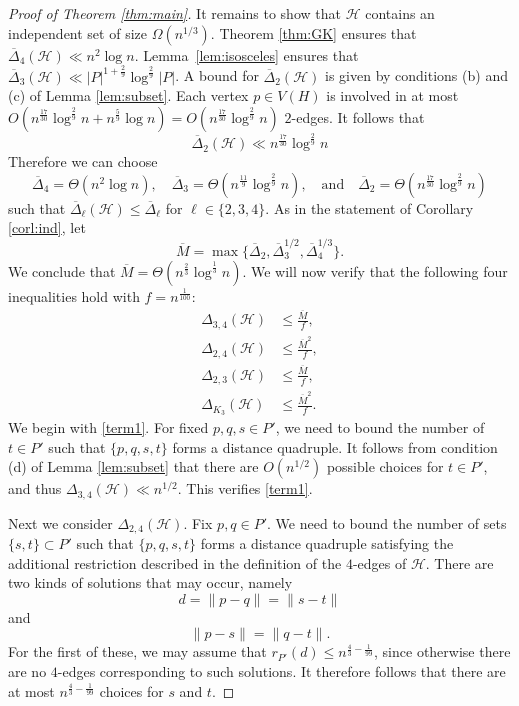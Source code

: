 \documentclass[11pt,oneside]{amsart}
\newcommand{\cH}{\mathcal{H}}
\numberwithin{exercise}{subsection}
\begin{document}
\begin{proof}[Proof of Theorem \ref{thm:main}]
It remains to show that $\mathcal{H}$ contains an independent set of size $\Omega(n^{1/3})$. Theorem \ref{thm:GK} ensures that $\overline{\Delta}_4(\mathcal{H}) \ll n^2 \log n$. Lemma~\ref{lem:isosceles} ensures that $\overline{\Delta}_3(\mathcal{H})\ll |P|^{1+\frac{2}{9}}\log^{\frac{2}{9}}|P|$. A bound for $\overline{\Delta}_2(\mathcal{H})$ is given by conditions (b) and (c) of Lemma \ref{lem:subset}. Each vertex $p \in V(H)$ is involved in at most  $O(n^{\frac{17}{30}} \log^{\frac29}n + n^{\frac59} \log n)=O(n^{\frac{17}{30}} \log^{\frac29}n)$ $2$-edges.  It follows that
\[
\overline{\Delta}_2(\mathcal{H}) \ll n^\frac{17}{30}\log ^{\frac29}n
\]
Therefore we can choose 
\begin{equation*}
\overline{\Delta}_4=\Theta(n^2 \log n), \quad \overline{\Delta}_3=\Theta(n^{\frac{11}{9}} \log^{\frac{2}{9}} n), \quad \text{and} \quad \overline{\Delta}_2=\Theta(n^\frac{17}{30}\log ^{\frac29}n)
\end{equation*}
such that $\overline{\Delta}_\ell(\mathcal{H})\leq \overline{\Delta}_\ell$ for $\ell\in \{2,3,4\}$. As in the statement of Corollary \ref{corl:ind}, let
\[
\overline{M}=\max \{
\overline{\Delta}_2, \overline{\Delta}_3^{1/2}, \overline{\Delta}_4^{1/3} \}.
\]
  We conclude that $\overline M=\Theta( n^{\frac{2}{3}} \log^{\frac{1}{3}} n)$. We will now verify that the following four inequalities hold with $f= n^{\frac{1}{100}}$:
\begin{align}
 \Delta_{3,4}(\cH) &\leq \frac{\overline M}{f} \label{term1},
 \\ \Delta_{2,4}(\cH) &\leq \frac{\overline M^2}{f} \label{term2},
  \\ \Delta_{2,3}(\cH) &\leq \frac{\overline M}{f} \label{term3},
   \\ \Delta_{K_3}(\cH) &\leq \frac{\overline M^2}{f} \label{term4}.
\end{align}
We begin with \eqref{term1}. For fixed $p,q,s \in P'$, we need to bound the number of $t \in P'$ such that $\{p,q,s,t \}$ forms a distance quadruple. It follows from condition (d) of Lemma \ref{lem:subset} that there are $O(n^{1/2})$ possible choices for $t \in P'$, and thus $\Delta_{3,4}(\cH) \ll n^{1/2}$. This verifies \eqref{term1}.

Next we consider $\Delta_{2,4}(\cH)$. Fix $p,q \in P'$. We need to bound the number of sets $\{s,t \} \subset P'$ such that $\{p,q,s,t\}$ forms a distance quadruple satisfying the additional restriction described in the definition of the $4$-edges of $\cH$. There are two kinds of solutions that may occur, namely 
\[
d=\|p-q\|=\|s-t\|
\]
and
\begin{equation} \label{type2}
\|p-s\|=\|q-t\|.
\end{equation}
For the first of these, we may assume that $r_{P'}(d) \leq n^{\frac{4}{3}- \frac{1}{99}}$, since otherwise there are no $4$-edges corresponding to such solutions. It therefore follows that there are at most $n^{\frac{4}{3}- \frac{1}{99}}$ choices for $s$ and $t$. 


\end{proof}
\end{document}
